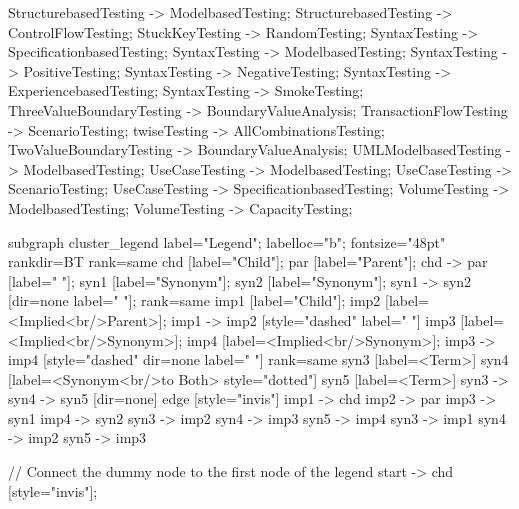 \documentclass{article}
\begin{document}
{StructurebasedTesting -> ModelbasedTesting;
StructurebasedTesting -> ControlFlowTesting;
StuckKeyTesting -> RandomTesting;
SyntaxTesting -> SpecificationbasedTesting;
SyntaxTesting -> ModelbasedTesting;
SyntaxTesting -> PositiveTesting;
SyntaxTesting -> NegativeTesting;
SyntaxTesting -> ExperiencebasedTesting;
SyntaxTesting -> SmokeTesting;
ThreeValueBoundaryTesting -> BoundaryValueAnalysis;
TransactionFlowTesting -> ScenarioTesting;
twiseTesting -> AllCombinationsTesting;
TwoValueBoundaryTesting -> BoundaryValueAnalysis;
UMLModelbasedTesting -> ModelbasedTesting;
UseCaseTesting -> ModelbasedTesting;
UseCaseTesting -> ScenarioTesting;
UseCaseTesting -> SpecificationbasedTesting;
VolumeTesting -> ModelbasedTesting;
VolumeTesting -> CapacityTesting;

subgraph cluster_legend {
    label="Legend";
    labelloc="b";
    fontsize="48pt"
    rankdir=BT
    {
        rank=same
        chd [label="Child"];
        par [label="Parent"];
        chd -> par [label="                "];
        syn1 [label="Synonym"];
        syn2 [label="Synonym"];
        syn1 -> syn2 [dir=none label="                "];
    }
    {
        rank=same
        imp1 [label="Child"];
        imp2 [label=<Implied<br/>Parent>];
        imp1 -> imp2 [style="dashed" label="                "]
        imp3 [label=<Implied<br/>Synonym>];
        imp4 [label=<Implied<br/>Synonym>];
        imp3 -> imp4 [style="dashed" dir=none label="                "]
    }
    {
        rank=same
        syn3 [label=<Term>]
        syn4 [label=<Synonym<br/>to Both> style="dotted"]
        syn5 [label=<Term>]
        syn3 -> syn4 -> syn5 [dir=none]
    }
    edge [style="invis"]
    imp1 -> chd
    imp2 -> par
    imp3 -> syn1
    imp4 -> syn2
syn3 -> imp2
syn4 -> imp3
syn5 -> imp4
syn3 -> imp1
syn4 -> imp2
syn5 -> imp3
}

// Connect the dummy node to the first node of the legend
start -> chd [style="invis"];
}
\end{document}

